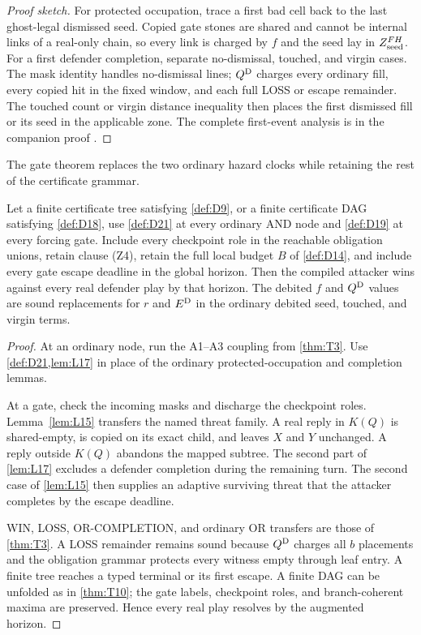 \begin{proof}[Proof sketch]
For protected occupation, trace a first bad cell back to the last ghost-legal
dismissed seed.  Copied gate stones are shared and cannot be internal links of
a real-only chain, so every link is charged by $f$ and the seed lay in
$Z_{\mathrm{seed}}^{FH}$.  For a first defender completion, separate no-dismissal, touched,
and virgin cases.  The mask identity handles no-dismissal lines; $Q^{\mathrm{D}}$
charges every ordinary fill, every copied hit in the fixed window, and each
full LOSS or escape remainder.  The touched count or virgin distance
inequality then places the first dismissed fill or its seed in the applicable
zone.  The complete first-event analysis is in the companion proof
\cite{hexobot-companions}.
\end{proof}

The gate theorem replaces the two ordinary hazard clocks while retaining the
rest of the certificate grammar.

\begin{theorem}
\label{thm:T11}
Let a finite certificate tree satisfying \cref{def:D9}, or a finite
certificate DAG satisfying \cref{def:D18}, use \cref{def:D21} at every
ordinary AND node and \cref{def:D19} at every forcing gate.  Include every
checkpoint role in the reachable obligation unions, retain clause
\textup{(Z4)}, retain the full local budget $B$ of \cref{def:D14}, and include
every gate escape deadline in the global horizon.  Then the compiled attacker
wins against every real defender play by that horizon.  The debited $f$ and
$Q^{\mathrm{D}}$ values are sound replacements for $r$ and $E^{\mathrm{D}}$ in the ordinary
debited seed, touched, and virgin terms.
\end{theorem}

\begin{proof}
At an ordinary node, run the A1--A3 coupling from \cref{thm:T3}.  Use
\cref{def:D21,lem:L17} in place of the ordinary protected-occupation and
completion lemmas.

At a gate, check the incoming masks and discharge the checkpoint roles.
Lemma~\ref{lem:L15} transfers the named threat family.  A real reply in
$K(Q)$ is shared-empty, is copied on its exact child, and leaves $X$ and $Y$
unchanged.  A reply outside $K(Q)$ abandons the mapped subtree.  The second
part of \cref{lem:L17} excludes a defender completion during the remaining
turn.  The second case of \cref{lem:L15} then supplies an adaptive surviving
threat that the attacker completes by the escape deadline.

WIN, LOSS, OR-COMPLETION, and ordinary OR transfers are those of
\cref{thm:T3}.  A LOSS remainder remains sound because $Q^{\mathrm{D}}$ charges all
$b$ placements and the obligation grammar protects every witness empty
through leaf entry.  A finite tree reaches a typed terminal or its first
escape.  A finite DAG can be unfolded as in \cref{thm:T10}; the gate labels,
checkpoint roles, and branch-coherent maxima are preserved.  Hence every real
play resolves by the augmented horizon.
\end{proof}

